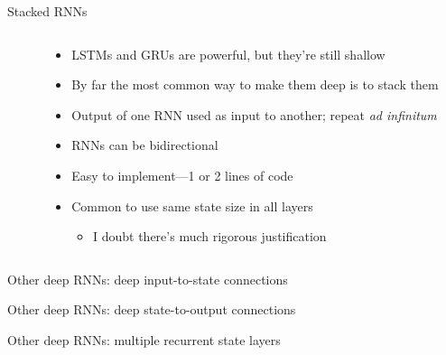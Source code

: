 \begin{frame}{Stacked RNN{}s}
    \begin{columns}
        \begin{column}{0.41\textwidth}
            
        \end{column}
        \begin{column}{0.59\textwidth}
            \begin{itemize}
                \item LSTM{}s and GRU{}s are powerful, but they're still shallow
                \item By far the most common way to make them deep is to \alert{stack} them
                \item Output of one RNN{} used as input to another; repeat \emph{ad infinitum}
                \pause
                \item RNN{}s can be bidirectional
                \item Easy to implement---1 or 2 lines of code
                \item Common to use same state size in all layers
                \begin{itemize}
                    \item I doubt there's much rigorous justification
                \end{itemize}
            \end{itemize}
        \end{column}
    \end{columns}
\end{frame}

\begin{frame}{Other deep RNN{}s: deep input-to-state connections}
    \hspace{2cm}
    
    
\end{frame}

\begin{frame}{Other deep RNN{}s: deep state-to-output connections}
    \hspace{2cm}
    
    
\end{frame}

\begin{frame}{Other deep RNN{}s: multiple recurrent state layers \citep{GravesICASSP13}}
    \hspace{2cm}
    
    
\end{frame}

